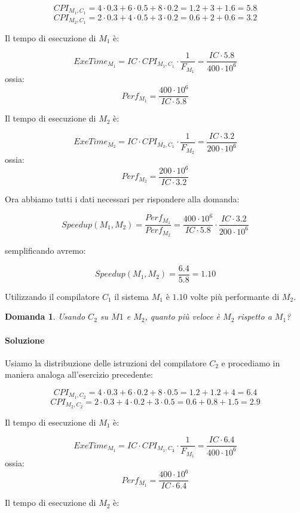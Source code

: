 \documentclass{article}
\newtheorem{domanda}{Domanda}[section]
\begin{document}
    $$CPI_{M_1, C_1} = 4 \cdot  0.3 + 6\cdot 0.5 + 8\cdot 0.2 = 1.2 + 3 + 1.6 = 5.8$$
    $$CPI_{M_2, C_1} = 2 \cdot  0.3 + 4\cdot 0.5 + 3\cdot 0.2 = 0.6 + 2 + 0.6 = 3.2$$
    
    Il tempo di esecuzione di $M_1$ è:
    
    $$ExeTime_{M_1} = IC\cdot CPI_{M_1,C_1} \cdot  \frac{1}{F_{M_{1}}} = \frac{IC\cdot 5.8}{400\cdot 10^{6}}$$
    ossia:
    $$Perf_{M_{1}} = \frac{400\cdot 10^{6}}{IC\cdot 5.8} $$
    
    Il tempo di esecuzione di $M_2$ è:
    
    $$ExeTime_{M_2} = IC\cdot CPI_{M_2,C_1} \cdot  \frac{1}{F_{M_{2}}} = \frac{IC\cdot 3.2}{200\cdot 10^{6}}$$
    ossia:
    $$Perf_{M_{2}} = \frac{200\cdot 10^{6}}{IC\cdot 3.2} $$
    
    Ora abbiamo tutti i dati necessari per rispondere alla domanda:
    
    $$Speedup(M_1, M_2) = \frac{Perf_{M_1}}{Perf_{M_2}} = \frac{400\cdot 10^6}{IC \cdot 5.8} \cdot  \frac{IC \cdot 3.2}{200\cdot 10^6}$$
    
    semplificando avremo:
    
    $$Speedup(M_1, M_2) = \frac{6.4}{5.8} = 1.10$$
    
    Utilizzando il compilatore $C_1$ il sistema $M_1$ è $1.10$ volte più performante di $M_2$.
    
    \begin{domanda}
    Usando $C_2$ su $M1$ e $M_2$, quanto più veloce è $M_2$ rispetto a $M_1$? 
    \end{domanda}
    
    \paragraph{Soluzione}
    Usiamo la distribuzione delle istruzioni del compilatore $C_2$ e procediamo in maniera analoga all'esercizio precedente:
    
    $$CPI_{M_1, C_2} = 4 \cdot  0.3 + 6\cdot 0.2 + 8\cdot 0.5 = 1.2 + 1.2 + 4 = 6.4$$
    $$CPI_{M_2, C_2} = 2 \cdot  0.3 + 4\cdot 0.2 + 3\cdot 0.5 = 0.6 + 0.8 + 1.5 = 2.9$$
    
    Il tempo di esecuzione di $M_1$ è:
    
    $$ExeTime_{M_1} = IC\cdot CPI_{M_1,C_2} \cdot  \frac{1}{F_{M_{1}}} = \frac{IC\cdot 6.4}{400\cdot 10^{6}}$$
    ossia:
    $$Perf_{M_{1}} = \frac{400\cdot 10^{6}}{IC\cdot 6.4} $$
    
    Il tempo di esecuzione di $M_2$ è:
    
\end{document}
